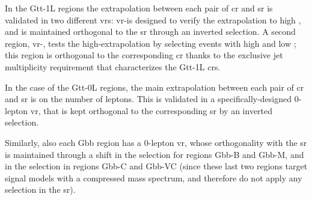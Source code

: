 In the Gtt-1L regions the extrapolation between each pair of \gls{cr} and \gls{sr} is validated in two different \glspl{vr}:
\gls{vr}-\mt is designed to verify the extrapolation to high \mt, and is maintained orthogonal to the \gls{sr} through an inverted \mjsum 
selection. A second region, \gls{vr}-\mtb, tests the high-\mtb extrapolation by selecting events with high \mtb and low \mt; 
this region is orthogonal to the corresponding \gls{cr} thanks to the exclusive jet multiplicity requirement that characterizes
the Gtt-1L \glspl{cr}.

In the case of the Gtt-0L regions, the main extrapolation between each pair of \gls{cr} and \gls{sr} is on the number of leptons. 
This is validated in a specifically-designed 0-lepton \gls{vr}, 
that is kept orthogonal to the corresponding \gls{sr} by an inverted \mjsum selection.

Similarly, also each Gbb region has a 0-lepton \gls{vr}, whose orthogonality with the \gls{sr} is maintained through 
a shift in the \meff selection for regions Gbb-B and Gbb-M, and in the \met selection in regions Gbb-C and Gbb-VC (since these last 
two regions target signal models with a compressed mass spectrum, and therefore do not apply any \meff selection in the \gls{sr}).



